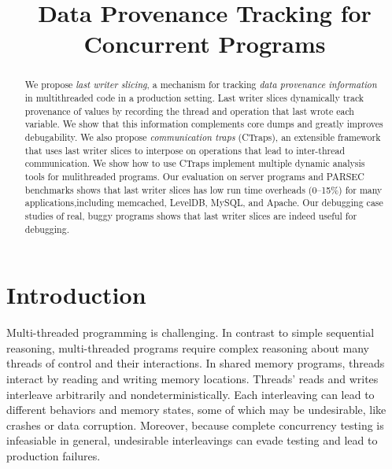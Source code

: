 \documentclass[preprint,10pt]{sigplanconf}
\title{Data Provenance Tracking for Concurrent Programs}
\newcommand{\ctraps}{CTraps\xspace}
\begin{document}
\maketitle

\begin{abstract}
We propose {\em last writer slicing}, a mechanism for tracking {\em data provenance information} in multithreaded code in a production setting.
Last writer slices dynamically track provenance of values by recording the thread and operation that last wrote each variable. We show that this information complements core dumps and greatly improves debugability. We also propose {\em communication traps}
(\ctraps), an extensible framework that uses last writer slices to interpose on operations that lead to inter-thread communication. We show how to use 
\ctraps implement multiple dynamic analysis tools for mulithreaded programs. Our evaluation on server programs and PARSEC benchmarks shows that last writer slices has low run time overheads (0--15\%) for many applications,including  
memcached, LevelDB, MySQL, and Apache. Our debugging case studies of
real, buggy programs shows that last writer slices are indeed useful for debugging.  
\end{abstract}

\section{Introduction}
Multi-threaded programming is challenging.  In contrast to simple sequential
reasoning, multi-threaded programs require complex reasoning about many threads
of control and their interactions.  In shared memory programs, threads interact
by reading and writing memory locations.  Threads' reads and writes interleave
arbitrarily and nondeterministically. Each interleaving can lead to different
behaviors and memory states, some of which may be undesirable, like crashes or
data corruption.  Moreover, because complete concurrency testing is infeasiable
in general, undesirable interleavings can evade testing and lead to production
failures.
\end{document}
